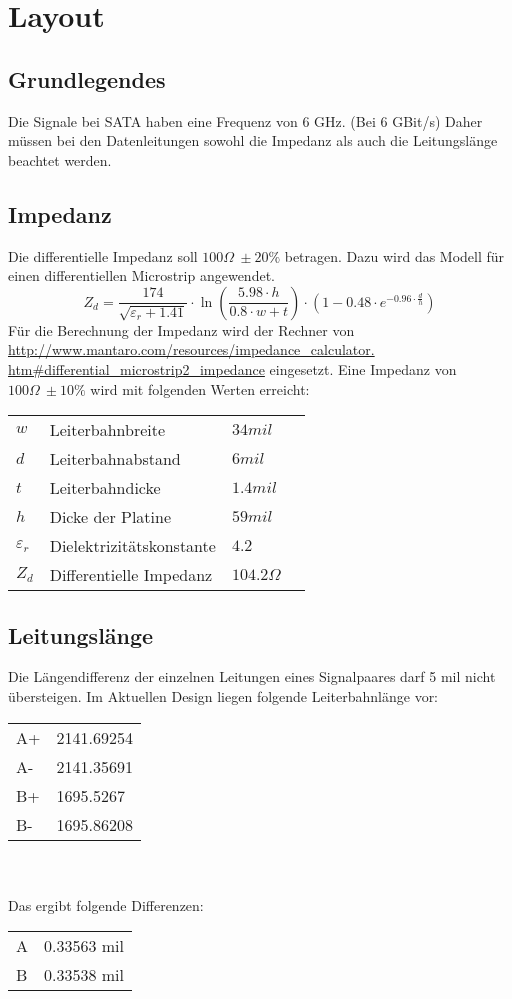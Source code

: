 
\section{Layout}

\subsection{Grundlegendes}
Die Signale bei SATA haben eine Frequenz von 6 GHz. (Bei 6 GBit/s)
Daher müssen bei den Datenleitungen sowohl die Impedanz als auch die 
Leitungslänge beachtet werden. 

\subsection{Impedanz}
Die differentielle Impedanz soll $100 \Omega~\pm 20 \%$ betragen. Dazu wird das 
Modell für einen differentiellen Microstrip angewendet. 
\[ Z_d = \frac{174}{\sqrt{\varepsilon_r + 1.41}} \cdot 
\ln \left(\frac{5.98 \cdot h}{0.8 \cdot w + t}\right) \cdot 
\left(1 - 0.48 \cdot e^{-0.96 \cdot \frac{d}{h}}\right) \]
Für die Berechnung der Impedanz wird der Rechner von 
\url{http://www.mantaro.com/resources/impedance_calculator.
htm#differential_microstrip2_impedance} 
eingesetzt. 
Eine Impedanz von $100 \Omega~\pm 10 \%$ wird mit folgenden Werten erreicht: 
\begin{tabular}{@{}llll}
$w$             & Leiterbahnbreite          &   $34 mil$        \\
$d$             & Leiterbahnabstand         &   $6 mil$         \\
$t$             & Leiterbahndicke           &   $1.4 mil$       \\
$h$             & Dicke der Platine         &   $59 mil$        \\
$\varepsilon_r$ & Dielektrizitätskonstante  &   $4.2$           \\
$Z_d$           & Differentielle Impedanz   &   $104.2 \Omega$  
\end{tabular}

\subsection{Leitungslänge}
Die Längendifferenz der einzelnen Leitungen eines Signalpaares darf 5 mil 
nicht übersteigen. Im Aktuellen Design liegen folgende Leiterbahnlänge vor: \\
\begin{tabular}{@{}ll}
A+  & 2141.69254 \\
A-  & 2141.35691 \\
B+  & 1695.5267 \\
B-  & 1695.86208 \\
\end{tabular} \\\\
Das ergibt folgende Differenzen: \\
\begin{tabular}{@{}ll}
A   & 0.33563 mil \\
B   & 0.33538 mil \\
\end{tabular}
